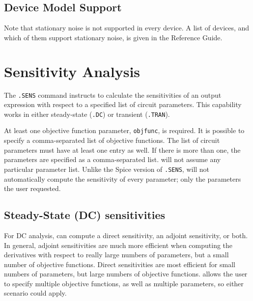 \subsection{Device Model Support}

Note that stationary noise is not supported in every \Xyce{} device.
A list of \Xyce{} devices, and which of them support stationary noise, is given 
in the \Xyce{} Reference Guide\ReferenceGuide{}.



\clearpage
\section{Sensitivity Analysis}
\label{SENS_Analysis}
\label{sensitivity_Overview}

The \texttt{.SENS}  command instructs \Xyce{} to calculate
the sensitivities of an output expression with respect 
to a specified list of circuit parameters.   This capability works in either 
steady-state (\texttt{.DC})  or transient (\texttt{.TRAN}).


At least one objective function parameter, \texttt{objfunc}, is required.  It is
possible to specify a comma-separated list of objective functions.  The list of circuit 
parameters must have at least one entry as well.  If there is more than one, the parameters
are specified as a comma-separated list.   \Xyce{} will not assume any particular
parameter list.  Unlike the Spice version of \texttt{.SENS}, \Xyce{} will not 
automatically compute the sensitivity of every parameter; only the parameters the
user requested.

\subsection{Steady-State (DC) sensitivities}

For DC analysis, \Xyce{} can compute a direct sensitivity, an adjoint sensitivity, or both.
In general, adjoint sensitivities are much more efficient when computing the derivatives
with respect to really large numbers of parameters, but a small number of objective
functions.  Direct sensitivities are most efficient for small numbers of parameters,
but large numbers of objective functions.  \Xyce{} allows the user to specify
multiple objective functions, as well as multiple parameters, so either scenario could apply.

